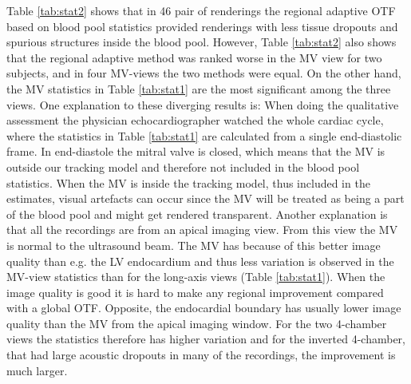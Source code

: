 Table \ref{tab:stat2} shows that in 46 pair of renderings the regional adaptive OTF based on blood pool statistics provided renderings with less tissue dropouts and spurious structures inside the blood pool. However, Table \ref{tab:stat2} also shows that the regional adaptive method was ranked worse in the MV view for two subjects, and in four MV-views the two methods were equal. On the other hand, the MV statistics in Table \ref{tab:stat1} are the most significant among the three views. One explanation to these diverging results is: When doing the qualitative assessment the physician echocardiographer watched the whole cardiac cycle, where the statistics in Table \ref{tab:stat1} are calculated from a single end-diastolic frame. In end-diastole the mitral valve is closed, which means that the MV is outside our tracking model and therefore not included in the blood pool statistics. When the MV is inside the tracking model, thus included in the estimates, visual artefacts can occur since the MV will be treated as being a part of the blood pool and might get rendered transparent. %
Another explanation is that all the recordings are from an apical imaging view. From this view the MV is normal to the ultrasound beam. The MV has because of this better image quality than e.g. the LV endocardium and thus less variation is observed in the MV-view statistics than for the long-axis views (Table \ref{tab:stat1}). When the image quality is good it is hard to make any regional improvement compared with a global OTF. Opposite, the endocardial boundary has usually lower image quality than the MV from the apical imaging window. For the two 4-chamber views the statistics therefore has higher variation and for the inverted 4-chamber, that had large acoustic dropouts in many of the recordings, the improvement is much larger. 

